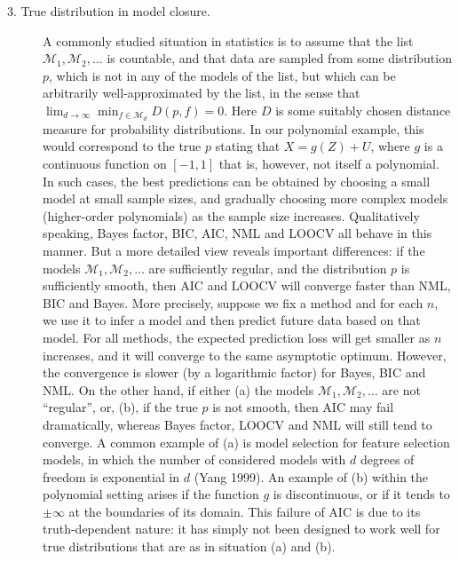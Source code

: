\documentclass[authoryear]{elsarticle}
\newcommand{\model}{\mathcal{M}}
\begin{document}
\begin{description}
\item[3. True distribution in model closure.] A commonly studied
  situation in statistics is to assume that the list $\model_1,
  \model_2, \ldots$ is countable, and that data are sampled from some
  distribution $p$, which is not in any of the models of the list, but
  which can be arbitrarily well-approximated by the list, in the sense
  that $\lim_{d \rightarrow \infty} \min_{f \in \model_d} D(p,f) = 0$.
  Here $D$ is some suitably chosen distance measure for probability
  distributions. In our polynomial example, this would correspond to
  the true $p$ stating that $X= g(Z) +U$, where $g$ is a continuous
  function on $[-1,1]$ that is, however, not itself a polynomial. In
  such cases, the best predictions can be obtained by choosing a small
  model at small sample sizes, and gradually choosing more complex
  models (higher-order polynomials) as the sample size increases.
  Qualitatively speaking, Bayes factor, BIC, AIC, NML and LOOCV all
  behave in this manner. But a more detailed view reveals important
  differences: if the models $\model_1, \model_2, \ldots$ are
  sufficiently regular, and the distribution $p$ is sufficiently
  smooth, then AIC and LOOCV will converge faster than NML, BIC and
  Bayes. More precisely, suppose we fix a method and for each $n$, we
  use it to infer a model and then predict future data based on that
  model. For all methods, the expected prediction loss will get
  smaller as $n$ increases, and it will converge to the same
  asymptotic optimum. However, the convergence is slower (by a
  logarithmic factor) for Bayes, BIC and NML. On the other hand, if
  either (a) the models $\model_1, \model_2, \ldots$ are not
  ``regular'', or, (b), if the true $p$ is not smooth, then AIC may
  fail dramatically, whereas Bayes factor, LOOCV and NML will still
  tend to converge. A common example of (a) is model selection for feature
  selection models, in which the number of considered models
  with $d$ degrees of freedom is exponential in $d$ (Yang 1999). An
  example of (b) within the polynomial setting arises if the
  function $g$ is discontinuous, or if it tends to $\pm \infty$ at
  the boundaries of its domain. This failure of AIC is due to its
  truth-dependent nature: it has simply not been designed to work well
  for true distributions that are as in situation (a) and (b). \vspace*{12pt}


\end{description}
\end{document}
